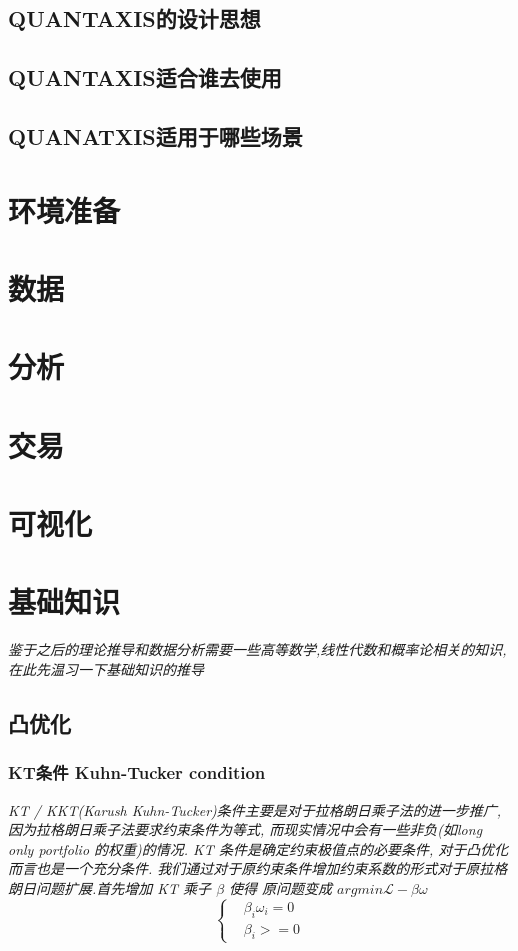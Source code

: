 \documentclass{scrartcl}
\numberwithin{equation}{section}   %
\begin{document}
\subsection{QUANTAXIS的设计思想}

\subsection{QUANTAXIS适合谁去使用}

\subsection{QUANATXIS适用于哪些场景}

\newpage
\section{环境准备}

\newpage
\section{数据}

\newpage
\section{分析}
\newpage
\section{交易}
\newpage
\section{可视化}
\newpage


  
\newpage
\section{基础知识}
\textsl{
    鉴于之后的理论推导和数据分析需要一些高等数学,线性代数和概率论相关的知识, 在此先温习一下基础知识的推导
}
\subsection{凸优化}
\subsubsection{KT条件 Kuhn-Tucker condition}
\textsl{
    KT / KKT(Karush Kuhn-Tucker)条件主要是对于拉格朗日乘子法的进一步推广, 因为拉格朗日乘子法要求约束条件为等式, 而现实情况中会有一些非负(如long only portfolio 的权重)的情况. KT 条件是确定约束极值点的必要条件, 对于凸优化而言也是一个充分条件. 我们通过对于原约束条件增加约束系数的形式对于原拉格朗日问题扩展.首先增加 KT 乘子 $\beta $ 使得 原问题变成 $ argmin \mathcal{L} - \beta \omega $
}
\begin{equation}
    \left\{
    \begin{array}{lr}
         & \beta_i \omega_i =0 \\ & \beta_i >=0
    \end{array}
    \right.
\end{equation}
\end{document}
